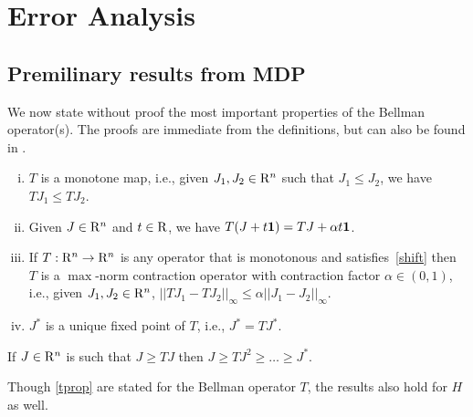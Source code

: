 \section{Error Analysis}\label{sec:errana}
\subsection{Premilinary results from MDP}
We now state without proof the most important properties of the Bellman operator(s).
The proofs are immediate from the definitions, but can also be found in \cite{BertB}.
\begin{comment}
First, we introduce some extra notation:
For $J_1,J_2\in \R^n$, we write $J_1\le J_2$ if $J_1(s)\le J_2(s)$ holds for all $s\in S$.
We use $\one \in \R^n$ to denote a vector with all entries $1$.
The maximum norm $\norm{\cdot}_{\infty}$ is defined by $ \norm{v}_{\infty} = \max_{s\in S} |v(s)|$.
\end{comment}
\begin{lemma}\label{tprop}
\begin{enumerate}[(i)]
\item \label{monotone}$T$ is a monotone map, i.e., given $J_1,J_2 \in \mathrm{R}^n$ such that $J_1\leq J_2$, we have $T J_1\leq T J_2$.
\item \label{shift}
Given $J\in \mathrm{R}^n$ and $t \in \mathrm{R}$, we have $T(J+t\mathbf{1})=TJ+\alpha t\mathbf{1}$.
\item \label{maxnorm}
If $T: \mathrm{R}^n \to \mathrm{R}^n$ is any operator that is monotonous and satisfies~\eqref{shift} then
$T$ is a $\max$-norm contraction operator with contraction factor $\alpha \in (0,1)$, i.e., given $J_1, J_2 \in \mathrm{R}^n$,
$
||TJ_1-TJ_2||_\infty\leq \alpha ||J_1-J_2||_\infty.
$
\item \label{uniquesol}
$J^*$ is a unique fixed point of $T$, i.e., $J^*=TJ^*$.
\end{enumerate}
\end{lemma}
\begin{corollary}
If $J\in \mathrm{R}^n$ is such that $J\geq TJ$ then $J\geq TJ^2\geq \ldots \geq J^*$.
\end{corollary}
Though \cref{tprop} are stated for the Bellman operator $T$, the results also hold for $H$ as well.
